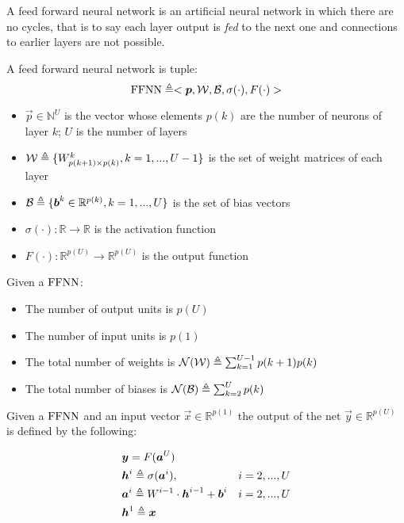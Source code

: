 
A feed forward neural network is an artificial neural network in which there are no cycles, that is to say each layer output is \textit{fed} to the 
next one and connections to earlier layers are not possible. 


\begin{defn}
\label{def_ffnn}
A feed forward neural network is tuple:
$$\mathrm{FFNN}\triangleq<\boldsymbol{p},\mathcal{W},\mathcal{B},\sigma(\cdot),F(\cdot)>$$
\begin{itemize}
 \item $\vec{p} \in \mathbb{N}^U$ is the vector whose elements $p(k)$ are the number of neurons of layer $k$; $U$ is the number of layers
 \item $\mathcal{W} \triangleq \{W^k_{p(k+1) \times p(k)}, k=1,...,U-1 \}$ is the set of weight matrices of each layer
 \item $\mathcal{B} \triangleq \{\boldsymbol{b}^k \in \mathbb{R}^{p(k)}, k=1,...,U \} $ is the set of bias vectors
 \item $\sigma(\cdot): \mathbb{R}\rightarrow \mathbb{R}$ is the activation function
 \item $F(\cdot): \mathbb{R}^{p(U)}\rightarrow \mathbb{R}^{p(U)}$ is the output function
\end{itemize}
\end{defn}

\begin{remark}{}
Given a $\mathrm{FFNN}$:
\begin{itemize}
 \item The number of output units is $p(U)$
 \item The number of input units is $p(1)$
 \item The total number of weights is $\mathcal{N}(\mathcal{W}) \triangleq \sum_{k=1}^{U-1} p(k+1)p(k)$
 \item The total number of biases is $\mathcal{N}(\mathcal{B}) \triangleq \sum_{k=2}^{U} p(k)$
\end{itemize}
\end{remark}

\begin{defn}
Given a $\mathrm{FFNN}$ and an input vector $\vec{x} \in \mathbb{R}^{p(1)}$ the output of the net $\vec{y} \in \mathbb{R}^{p(U)}$  is defined by the following:

\begin{align}
&\boldsymbol{y}=F(\boldsymbol{a}^{U}) &\\
&\boldsymbol{h}^{i} \triangleq \sigma(\boldsymbol{a}^{i}), & i=2,...,U\\
&\boldsymbol{a}^{i} \triangleq W^{i-1} \cdot \boldsymbol{h}^{i-1} +\boldsymbol{b}^i  & i=2,...,U\\
&\boldsymbol{h}^{1} \triangleq \boldsymbol{x} &
\end{align}
\end{defn}

